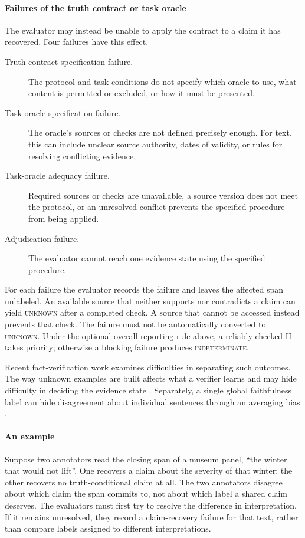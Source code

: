 \documentclass{clv2025}
\begin{document}
\paragraph{Failures of the truth contract or task oracle}
The evaluator may instead be unable to apply the contract to a claim it has
recovered. Four failures have this effect.
\begin{description}
  \item[Truth-contract specification failure.] The protocol and task conditions
        do not specify which oracle to use, what content is permitted or
        excluded, or how it must be presented.
  \item[Task-oracle specification failure.] The oracle's sources or checks are
        not defined precisely enough. For text, this can include unclear source
        authority, dates of validity, or rules for resolving conflicting evidence.
  \item[Task-oracle adequacy failure.] Required sources or checks are unavailable,
        a source version does not meet the protocol, or an unresolved conflict
        prevents the specified procedure from being applied.
  \item[Adjudication failure.] The evaluator cannot reach one evidence state
        using the specified procedure.
\end{description}
For each failure the evaluator records the failure and leaves the affected span
unlabeled.
An available source that neither supports nor contradicts a claim can yield
\textsc{unknown} after a completed check. A source that cannot be accessed
instead prevents that check. The failure must not be automatically converted
to \textsc{unknown}. Under the optional overall reporting rule above, a
reliably checked H takes priority; otherwise a blocking failure produces
\textsc{indeterminate}.

Recent fact-verification work examines difficulties in separating such
outcomes. The way unknown examples are built affects what a verifier learns
and may hide difficulty in deciding the evidence state
\citep{qiu_evidence_2026}. Separately, a single global faithfulness label can
hide disagreement about individual sentences through an averaging bias
\citep{zhang_averaging_2026}.

\paragraph{An example}
Suppose two annotators read the closing span of a museum panel, ``the winter
that would not lift''.
One recovers a claim about the severity of that winter; the other recovers no
truth-conditional claim at all.
The two annotators disagree about which claim the span commits to, not about
which label a shared claim deserves.
The evaluators must first try to resolve the difference in interpretation.
If it remains unresolved, they record a claim-recovery failure for that text,
rather than compare labels assigned to different interpretations.
\end{document}
